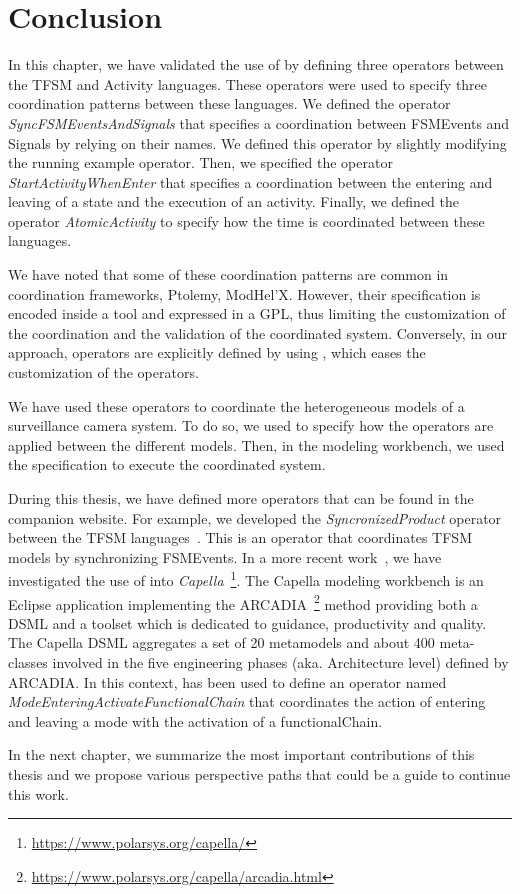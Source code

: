 \section{Conclusion}
In this chapter, we have validated the use of \bcool by defining three operators between the TFSM and Activity languages. These operators were used to specify three coordination patterns between these languages. We defined the operator \emph{SyncFSMEventsAndSignals} that specifies a coordination between FSMEvents and Signals by relying on their names. We defined this operator by slightly modifying the running example operator. Then, we specified the operator \emph{StartActivityWhenEnter} that specifies a coordination between the entering and leaving of a state and the execution of an activity. Finally, we defined the operator \emph{AtomicActivity} to specify how the time is coordinated between these languages.
	
We have noted that some of these coordination patterns are common in coordination frameworks, \eg Ptolemy, ModHel'X. However, their specification is encoded inside a tool and expressed in a GPL, thus limiting the customization of the coordination and the validation of the coordinated system. Conversely, in our approach, operators are explicitly defined by using \bcool, which eases the customization of the operators.
	
We have used these operators to coordinate the heterogeneous models of a surveillance camera system. To do so, we used \bflow to specify how the operators are applied between the different models. Then, in the modeling workbench, we used the \bflow specification to execute the coordinated system.  
	
	
During this thesis, we have defined more operators that can be found in the companion website. For example, we developed the \emph{SyncronizedProduct} operator between the TFSM languages~\cite{bcoolmodels15}. This is an operator that coordinates TFSM models by synchronizing FSMEvents. %
In a more recent work~\cite{combemaleerts16bib}, we have investigated the use of \bcool into \emph{Capella}~\footnote{\url{https://www.polarsys.org/capella/}}. The Capella modeling workbench is an Eclipse application implementing the ARCADIA~\footnote{\url{https://www.polarsys.org/capella/arcadia.html}} method providing both a DSML and a toolset which is dedicated to guidance, productivity and quality. The Capella DSML aggregates a set of 20 metamodels and about 400 meta-classes involved in the five engineering phases (aka. Architecture level) defined by ARCADIA. In this context, \bcool has been used to define an operator named \emph{ModeEnteringActivateFunctionalChain} that coordinates the action of entering and leaving a mode with the activation of a functionalChain.
	
In the next chapter, we summarize the most important contributions of this thesis and we propose various perspective paths that could be a guide to continue this work. 
	
